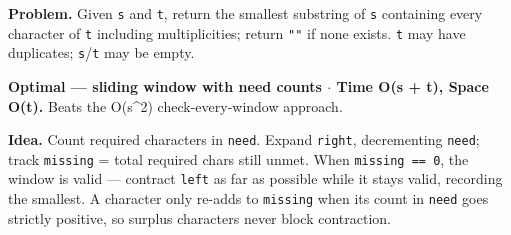 \documentclass[11pt]{article}
\begin{document}
\textbf{Problem.} Given \texttt{s} and \texttt{t}, return the smallest substring of \texttt{s} containing every character of \texttt{t} including multiplicities; return \texttt{""} if none exists. \texttt{t} may have duplicates; \texttt{s}/\texttt{t} may be empty.

\textbf{Optimal --- sliding window with need counts \(\cdot\) Time O(\textbar s\textbar{} + \textbar t\textbar), Space O(\textbar t\textbar).} Beats the O(\textbar s\textbar\^{}2) check-every-window approach.

\textbf{Idea.} Count required characters in \texttt{need}. Expand \texttt{right}, decrementing \texttt{need}; track \texttt{missing} = total required chars still unmet. When \texttt{missing\ ==\ 0}, the window is valid --- contract \texttt{left} as far as possible while it stays valid, recording the smallest. A character only re-adds to \texttt{missing} when its count in \texttt{need} goes strictly positive, so surplus characters never block contraction.

\end{document}
